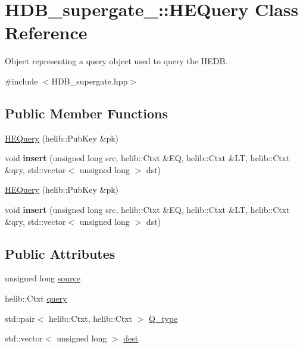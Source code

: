 \hypertarget{classHDB__supergate___1_1HEQuery}{}\section{H\+D\+B\+\_\+supergate\+\_\+\+:\+:H\+E\+Query Class Reference}
\label{classHDB__supergate___1_1HEQuery}


Object representing a query object used to query the H\+E\+DB.  




{\ttfamily \#include $<$H\+D\+B\+\_\+supergate.\+hpp$>$}

\subsection*{Public Member Functions}
\begin{DoxyCompactItemize}
\item 
\hyperlink{classHDB__supergate___1_1HEQuery_aa860d9296f75ed1c4c39e81564108f18}{H\+E\+Query} (helib\+::\+Pub\+Key \&pk)
\item 
\mbox{\label{classHDB__supergate___1_1HEQuery_ad9aba25ac1b662292759221d7edb9acb}} 
void {\bfseries insert} (unsigned long src, helib\+::\+Ctxt \&EQ, helib\+::\+Ctxt \&LT, helib\+::\+Ctxt \&qry, std\+::vector$<$ unsigned long $>$ dst)
\item 
\hyperlink{classHDB__supergate___1_1HEQuery_aa860d9296f75ed1c4c39e81564108f18}{H\+E\+Query} (helib\+::\+Pub\+Key \&pk)
\item 
\mbox{\label{classHDB__supergate___1_1HEQuery_ad9aba25ac1b662292759221d7edb9acb}} 
void {\bfseries insert} (unsigned long src, helib\+::\+Ctxt \&EQ, helib\+::\+Ctxt \&LT, helib\+::\+Ctxt \&qry, std\+::vector$<$ unsigned long $>$ dst)
\end{DoxyCompactItemize}
\subsection*{Public Attributes}
\begin{DoxyCompactItemize}
\item 
unsigned long \hyperlink{classHDB__supergate___1_1HEQuery_ad838cd0c6b56ca367effa1f1756e3fe5}{source}
\item 
helib\+::\+Ctxt \hyperlink{classHDB__supergate___1_1HEQuery_a4f6c52dc14ce033598e3ee9a7411fa75}{query}
\item 
std\+::pair$<$ helib\+::\+Ctxt, helib\+::\+Ctxt $>$ \hyperlink{classHDB__supergate___1_1HEQuery_a21c317527c7f5873d4ca2880c944611d}{Q\+\_\+type}
\item 
std\+::vector$<$ unsigned long $>$ \hyperlink{classHDB__supergate___1_1HEQuery_a1c1b7da0abf2fcee00f97e0b4d39c705}{dest}
\end{DoxyCompactItemize}


